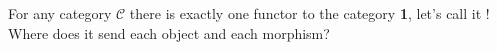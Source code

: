 
For any category $\mathcal{C}$ there is exactly one functor to the category \textbf{1}, let's call it $!$ Where does it send each object and each morphism?